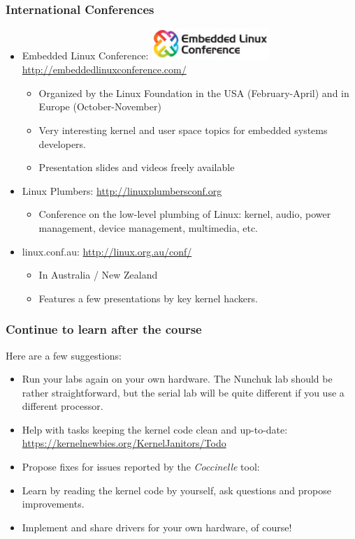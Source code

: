 \begin{frame}
  \frametitle{International Conferences}
  \begin{itemize}
  \item Embedded Linux Conference:
    \includegraphics[width=0.35\textwidth]{slides/kernel-resources-references/elc-logo.png}\\
    \url{http://embeddedlinuxconference.com/}
    \begin{itemize}
    \item Organized by the Linux Foundation in the USA (February-April)
          and in Europe (October-November)
    \item Very interesting kernel and user space topics for embedded
      systems developers.
    \item Presentation slides and videos freely available
    \end{itemize}
  \item Linux Plumbers: \url{http://linuxplumbersconf.org}
    \begin{itemize}
    \item Conference on the low-level plumbing of Linux: kernel,
      audio, power management, device management, multimedia, etc.
    \end{itemize}
  \item linux.conf.au: \url{http://linux.org.au/conf/}
    \begin{itemize}
    \item In Australia / New Zealand
    \item Features a few presentations by key kernel hackers.
    \end{itemize}
  \end{itemize}
\end{frame}

\begin{frame}
  \frametitle{Continue to learn after the course}
  Here are a few suggestions:
  \begin{itemize}
  \item Run your labs again on your own hardware. The Nunchuk lab should
        be rather straightforward, but the serial lab will be quite different
	if you use a different processor.
  \item Help with tasks keeping the kernel code clean and up-to-date:\\
	\url{https://kernelnewbies.org/KernelJanitors/Todo}
  \item Propose fixes for issues reported by the {\em Coccinelle} tool:\\
  \item Learn by reading the kernel code by yourself, ask questions and
	propose improvements.
  \item Implement and share drivers for your own hardware, of course!
  \end{itemize}
\end{frame}
